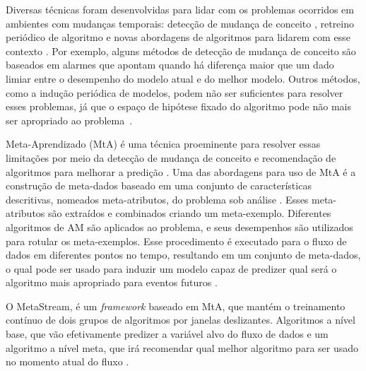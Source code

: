Diversas técnicas foram desenvolvidas para lidar com os problemas ocorridos em ambientes com mudanças
temporais: detecção de mudança de conceito
\cite{klinkenberg2000detecting,zenisek2019machine}, retreino periódico de algoritmo
\cite{bifet2007learning,anderson2019recurring,ramanath2020lambda} e novas abordagens de algoritmos para lidarem com esse contexto \cite{zang2014comparative,manapragada2018extremely,cano2020kappa}. Por exemplo, alguns
métodos de detecção de mudança de conceito \cite{gama2010knowledge} são
baseados em alarmes que apontam quando há diferença maior que um dado limiar entre o desempenho do
modelo atual e do melhor modelo. Outros métodos,
como a indução periódica de modelos, podem não ser suficientes para resolver
esses problemas, já que o espaço de hipótese fixado do algoritmo pode não mais
ser apropriado ao problema~\cite{rossi2014metastream}.

Meta-Aprendizado (MtA) é uma técnica proeminente para resolver essas limitações
por meio da detecção de mudança de conceito e recomendação de algoritmos para
melhorar a predição \cite{Anderson2019,VanRijn2016,Zarmehri2015}. Uma das abordagens para uso de MtA é a construção de meta-dados \cite{Vanschoren2018,khan2020literature} baseado em uma
conjunto de características descritivas, nomeados meta-atributos, do problema
sob análise \cite{Rivolli2018,lorena2019complex}. Esses meta-atributos são extraídos e combinados
criando um meta-exemplo. Diferentes algoritmos de AM são aplicados ao problema,
e seus desempenhos são utilizados para rotular os meta-exemplos. Esse
procedimento é executado para o fluxo de dados em diferentes pontos no tempo,
resultando em um conjunto de meta-dados, o qual pode ser usado para induzir um
modelo capaz de predizer qual será o algoritmo mais apropriado para eventos
futuros \cite{Munoz2018}.

O MetaStream, é um \textit{framework} baseado em MtA, que mantém o treinamento contínuo de dois grupos de algoritmos por janelas deslizantes. Algoritmos a nível base, que vão efetivamente predizer a variável alvo do fluxo de dados e um algoritmo a nível meta, que irá recomendar qual melhor algoritmo para ser usado no momento atual do fluxo \cite{rossi2012, rossi2014metastream}.

